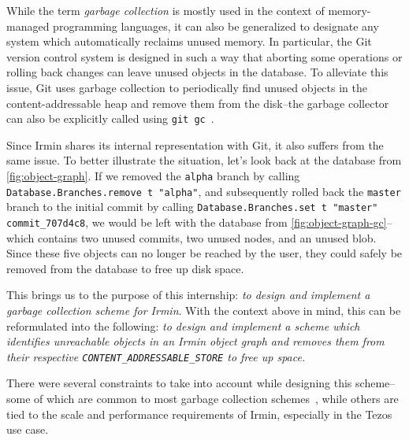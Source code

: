 While the term \emph{garbage collection} is mostly used in the context of memory-managed programming languages, it can also be generalized to designate any system which automatically reclaims unused memory. In particular, the Git version control system is designed in such a way that aborting some operations or rolling back changes can leave unused objects in the database. To alleviate this issue, Git uses garbage collection to periodically find unused objects in the content-addressable heap and remove them from the disk--the garbage collector can also be explicitly called using \texttt{git\ gc}~\cite{git-gc}.

Since Irmin shares its internal representation with Git, it also suffers from the same issue. To better illustrate the situation, let's look back at the database from \cref{fig:object-graph}. If we removed the \texttt{alpha} branch by calling \texttt{Database.Branches.remove t "alpha"}, and subsequently rolled back the \texttt{master} branch to the initial commit by calling \texttt{Database.Branches.set t "master" commit_707d4c8}, we would be left with the database from \cref{fig:object-graph-gc}--which contains two unused commits, two unused nodes, and an unused blob. Since these five objects can no longer be reached by the user, they could safely be removed from the database to free up disk space.



\bigskip
This brings us to the purpose of this internship: \emph{to design and implement a garbage collection scheme for Irmin}. With the context above in mind, this can be reformulated into the following: \emph{to design and implement a scheme which identifies unreachable objects in an Irmin object graph and removes them from their respective \texttt{CONTENT\_ADDRESSABLE\_STORE} to free up space.}

There were several constraints to take into account while designing this scheme--some of which are common to most garbage collection schemes~\cite{handbook}, while others are tied to the scale and performance requirements of Irmin, especially in the Tezos use case.

